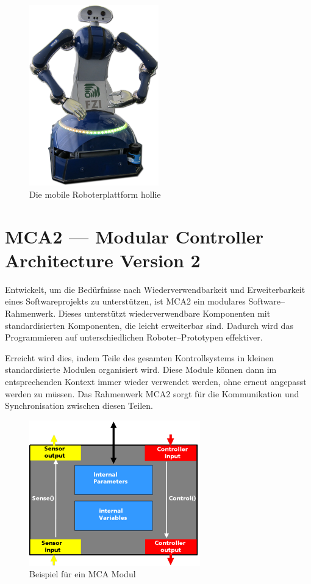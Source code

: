 \begin{figure}[h]
	\center
	\includegraphics[width=0.5\textwidth]{graphics/hollie}
	\caption{\label{fig:hollie} Die mobile Roboterplattform \gls{hollie}}
\end{figure}


\section{MCA2 --- Modular Controller Architecture Version 2}
\authorsection{\editoranne}

Entwickelt, um die Bedürfnisse nach Wiederverwendbarkeit und Erweiterbarkeit eines Softwareprojekts zu unterstützen,
 ist MCA2 ein modulares Software--Rahmenwerk. Dieses unterstützt wiederverwendbare Komponenten mit standardisierten Komponenten,
 die leicht erweiterbar sind. Dadurch wird das Programmieren auf unterschiedlichen Roboter--Prototypen effektiver.

Erreicht wird dies, indem Teile des gesamten Kontrollsystems in kleinen standardisierte Modulen organisiert wird.
 Diese Module können dann im entsprechenden Kontext immer wieder verwendet werden, ohne erneut angepasst werden zu müssen.
 Das Rahmenwerk MCA2 sorgt für die Kommunikation und Synchronisation zwischen diesen Teilen.

\begin{figure}[h]
	\center
	\includegraphics[scale=2.0]{graphics/mcamodule.png}
	\caption{\label{fig:MCA-Modul} Beispiel für ein MCA Modul}
\end{figure}

